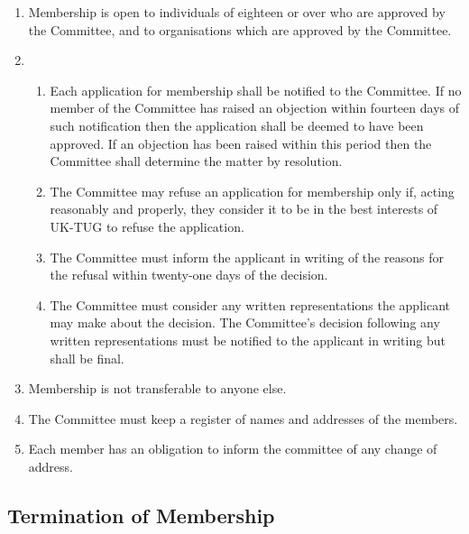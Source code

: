 \documentclass[a4paper,11pt]{article}
\begin{document}
\begin{enumerate}
\item Membership is open to individuals of eighteen or over who are
approved by the Committee, and to organisations which are
approved by the Committee.
\item 
\begin{enumerate}
\item Each application for membership shall be notified to the Committee.
  If no member of the Committee has raised an objection within fourteen days of
  such notification then the application shall be deemed to have been approved.
  If an objection has been raised within this period then the Committee shall
  determine the matter by resolution.
\item The Committee may refuse an application for membership only if, acting
  reasonably and properly, they consider it to be in the best interests of
  UK-TUG to refuse the application.
\item The Committee must inform the applicant in writing of the reasons for the
  refusal within twenty-one days of the decision.
\item The Committee must consider any written representations the applicant may
  make about the decision. The Committee's decision following any written
  representations must be notified to the applicant in writing but shall be
  final.
\end{enumerate}
\item Membership is not transferable to anyone else.
\item The Committee must keep a register of names and addresses of the members.
\item Each member has an obligation to inform the committee of any change of
  address.
\end{enumerate}

\subsection{Termination of Membership}
\end{document}
